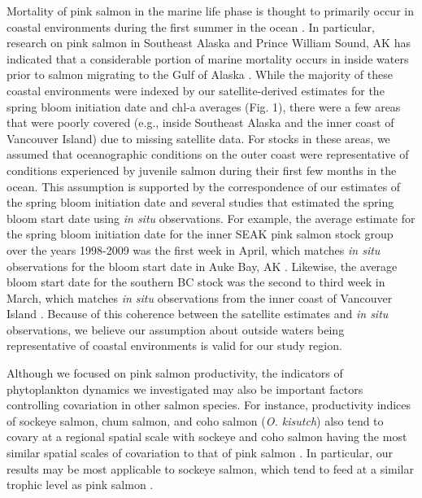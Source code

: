 Mortality of pink salmon in the marine life phase is thought to primarily occur
in coastal environments during the first summer in the ocean \citep{Farley2007a,
Parker1968a, Wertheimer2007a}. In particular, research on pink salmon in
Southeast Alaska and Prince William Sound, AK has indicated that a considerable
portion of marine mortality occurs in inside waters prior to salmon migrating to
the Gulf of Alaska \citep{Orsi2013, Farley2007a}. While the majority of these
coastal environments were indexed by our satellite-derived estimates for the
spring bloom initiation date and chl-a averages (Fig. 1), there were a few areas
that were poorly covered (e.g., inside Southeast Alaska and the inner coast of
Vancouver Island) due to missing satellite data. For stocks in these areas, we
assumed that oceanographic conditions on the outer coast were representative of
conditions experienced by juvenile salmon during their first few months in the
ocean. This assumption is supported by the correspondence of our estimates of
the spring bloom initiation date and several studies that estimated the spring
bloom start date using \emph{in situ} observations. For example, the average
estimate for the spring bloom initiation date for the inner SEAK pink salmon
stock group over the years 1998-2009 was the first week in April, which matches
\emph{in situ} observations for the bloom start date in Auke Bay, AK
\citep{Ziemann1991}. Likewise, the average bloom start date for the southern BC
stock was the second to third week in March, which matches \emph{in situ}
observations from the inner coast of Vancouver Island \citep{Chittenden2010a}.
Because of this coherence between the satellite estimates and \emph{in situ}
observations, we believe our assumption about outside waters being
representative of coastal environments is valid for our study region.

Although we focused on pink salmon productivity, the indicators of phytoplankton
dynamics we investigated may also be important factors controlling covariation
in other salmon species. For instance, productivity indices of sockeye salmon,
chum salmon, and coho salmon (\emph{O. kisutch}) also tend to covary at a
regional spatial scale with sockeye and coho salmon having the most similar
spatial scales of covariation to that of pink salmon \citep{Mueter2002b,
Teo2009a, Peterman2012}. In particular, our results may be most applicable to
sockeye salmon, which tend to feed at a similar trophic level as pink salmon
\citep{Johnson2009a}.

